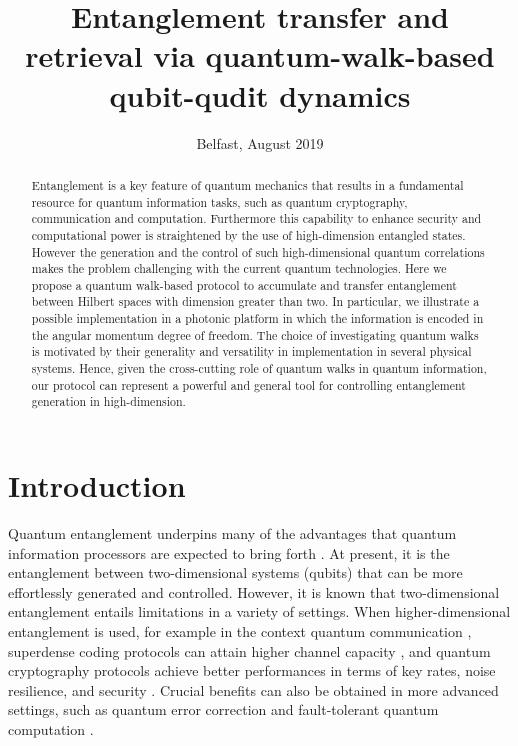 \documentclass[
	aps, pra,
	superscriptaddress, twocolumn,
	floatfix,
	10pt
]{revtex4-1}
\newcommand{\parTitle}[1]{\noindent{\color{Mahogany}(\emph{#1})}}
\renewcommand{\parTitle}[1]{}
\begin{document}
\title{Entanglement transfer and retrieval via quantum-walk-based qubit-qudit dynamics}
\author{Belfast, August 2019}

\begin{abstract}
Entanglement is a key feature of quantum mechanics that results in a fundamental resource for quantum information tasks, such as quantum cryptography, communication and computation. Furthermore this capability to enhance security and computational power is straightened by the use of high-dimension entangled states. However the generation and the control of such high-dimensional quantum correlations makes the problem  challenging with the current quantum technologies.  Here we propose a quantum walk-based protocol to accumulate and transfer entanglement between Hilbert spaces with dimension greater than two. In particular, we illustrate a possible implementation in a photonic platform in which the information is encoded in the angular momentum degree of freedom. The choice of investigating quantum walks is motivated by their generality and versatility in implementation in several physical systems. Hence, given the cross-cutting role of quantum walks in quantum information, our protocol can represent  a  powerful and general tool for controlling entanglement generation in high-dimension.
\end{abstract}
\maketitle


\section{Introduction}

\parTitle{High-dimensional entanglement is relevant}
Quantum entanglement underpins many of the advantages that quantum information processors are expected to bring forth \cite{horodecki2009quantum}. At present, it is the entanglement between two-dimensional systems (qubits) that can be more effortlessly generated and controlled. However, it is known that two-dimensional entanglement entails limitations in a variety of settings. When higher-dimensional entanglement is used, for example in the context quantum communication \cite{cozzolino2019high}, superdense coding protocols can attain higher channel capacity \cite{liu2002general, grudka2002symmetric, hu2018beating}, and quantum cryptography protocols achieve better performances in terms of key rates, noise resilience, and security \cite{bechmannpasquinucci2000quantum, cerf2002security, Bruss2002, Karimipour2002, acin2003security, karimipour2002quantum,  durt2004security, groblacher2006experimental, huber2013weak, nunn2013largealphabet, mower2013highdimensional, lee2014entanglementbased, zhong2015photonefficient, Mirhosseini_2015}. Crucial benefits can also be obtained in more advanced settings, such as quantum error correction \cite{Chuang1997, Campbell2012, Duclos-Cianci2013, Michael2016} and fault-tolerant quantum computation \cite{bartlett2002quantum,ralph2007efficient, Lanyon2009, Campbell2014}.
\end{document}
